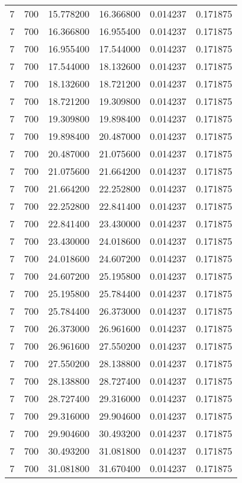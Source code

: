 \begin{longtable}{rrrrrr}
7 & 700 & 15.778200 & 16.366800 & 0.014237 & 0.171875 \\
7 & 700 & 16.366800 & 16.955400 & 0.014237 & 0.171875 \\
7 & 700 & 16.955400 & 17.544000 & 0.014237 & 0.171875 \\
7 & 700 & 17.544000 & 18.132600 & 0.014237 & 0.171875 \\
7 & 700 & 18.132600 & 18.721200 & 0.014237 & 0.171875 \\
7 & 700 & 18.721200 & 19.309800 & 0.014237 & 0.171875 \\
7 & 700 & 19.309800 & 19.898400 & 0.014237 & 0.171875 \\
7 & 700 & 19.898400 & 20.487000 & 0.014237 & 0.171875 \\
7 & 700 & 20.487000 & 21.075600 & 0.014237 & 0.171875 \\
7 & 700 & 21.075600 & 21.664200 & 0.014237 & 0.171875 \\
7 & 700 & 21.664200 & 22.252800 & 0.014237 & 0.171875 \\
7 & 700 & 22.252800 & 22.841400 & 0.014237 & 0.171875 \\
7 & 700 & 22.841400 & 23.430000 & 0.014237 & 0.171875 \\
7 & 700 & 23.430000 & 24.018600 & 0.014237 & 0.171875 \\
7 & 700 & 24.018600 & 24.607200 & 0.014237 & 0.171875 \\
7 & 700 & 24.607200 & 25.195800 & 0.014237 & 0.171875 \\
7 & 700 & 25.195800 & 25.784400 & 0.014237 & 0.171875 \\
7 & 700 & 25.784400 & 26.373000 & 0.014237 & 0.171875 \\
7 & 700 & 26.373000 & 26.961600 & 0.014237 & 0.171875 \\
7 & 700 & 26.961600 & 27.550200 & 0.014237 & 0.171875 \\
7 & 700 & 27.550200 & 28.138800 & 0.014237 & 0.171875 \\
7 & 700 & 28.138800 & 28.727400 & 0.014237 & 0.171875 \\
7 & 700 & 28.727400 & 29.316000 & 0.014237 & 0.171875 \\
7 & 700 & 29.316000 & 29.904600 & 0.014237 & 0.171875 \\
7 & 700 & 29.904600 & 30.493200 & 0.014237 & 0.171875 \\
7 & 700 & 30.493200 & 31.081800 & 0.014237 & 0.171875 \\
7 & 700 & 31.081800 & 31.670400 & 0.014237 & 0.171875 \\

\end{longtable}

